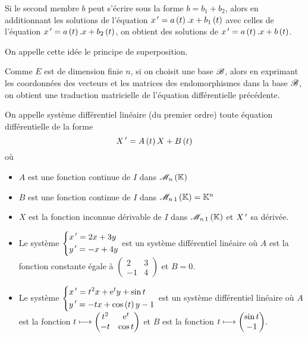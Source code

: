 \begin{rem}
Si le second membre \(b\) peut s'écrire sous la forme \(b=b_1+b_2\), alors en additionnant les solutions de l'équation \(x^{\,\prime}=a\left(t\right).x+b_1\left(t\right)\) avec celles de l'équation \(x^{\,\prime}=a\left(t\right).x+b_2\left(t\right)\), on obtient des solutions de \(x^{\,\prime}=a\left(t\right).x+b\left(t\right)\).

On appelle cette idée le principe de superposition.
\end{rem}

Comme \(E\) est de dimension finie \(n\), si on choisit une base \(\mathscr{B}\), alors en exprimant les coordonnées des vecteurs et les matrices des endomorphismes dans la base \(\mathscr{B}\), on obtient une traduction matricielle de l'équation différentielle précédente.

\begin{defi}
On appelle système différentiel linéaire (du premier ordre) toute équation différentielle de la forme \[X^{\,\prime}=A\left(t\right)X+B\left(t\right)\] où

\begin{itemize}
    \item \(A\) est une fonction continue de \(I\) dans \(\M{n}\) \\
    \item \(B\) est une fonction continue de \(I\) dans \(\M{n\,1}=\K^n\) \\
    \item \(X\) est la fonction inconnue dérivable de \(I\) dans \(\M{n\,1}\) et \(X^{\,\prime}\) sa dérivée.
\end{itemize}
\end{defi}

\begin{ex}
\begin{itemize}
    \item Le système \(\begin{dcases}
        x^{\,\prime}=2x+3y \\
        y^{\,\prime}=-x+4y
    \end{dcases}\) est un système différentiel linéaire où \(A\) est la fonction constante égale à \(\begin{pmatrix}
        2 & 3 \\
        -1 & 4
    \end{pmatrix}\) et \(B=0\). \\
    \item Le système \(\begin{dcases}
        x^{\,\prime}=t^2x+\mathrm{e}^{t}y+\sin t \\
        y^{\,\prime}=-tx+\cos\left(t\right)y-1
    \end{dcases}\) est un système différentiel linéaire où \(A\) est la fonction \(t\longmapsto\begin{pmatrix}
        t^2 & \mathrm{e}^{t} \\
        -t & \cos t
    \end{pmatrix}\) et \(B\) est la fonction \(t\longmapsto\begin{pmatrix}\sin t\\-1\end{pmatrix}\).
\end{itemize}
\end{ex}

